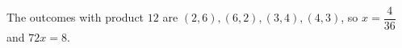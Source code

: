 The outcomes with product $12$ are $(2,6),(6,2),(3,4),(4,3)$, so $x=\dfrac4{36}$ and $72x=\boxed{8}$.
